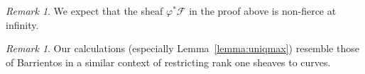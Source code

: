 \documentclass[twoside]{amsart}
\newcommand{\Ff}{\mathscr{F}}
\renewcommand{\phi}{\varphi}
\theoremstyle{plain}
\theoremstyle{definition}
\theoremstyle{remark}
\newtheorem{remark}[subsubsection]{Remark}
\numberwithin{equation}{subsection}
\begin{document}
\begin{remark}
We expect that the sheaf $\phi^* \Ff$ in the proof above is non-fierce at infinity.
\end{remark}

\begin{remark}
Our calculations (especially Lemma~\ref{lemma:uniqmax}) resemble those of Barrientos \cite[\S 5]{Barrientos} in a similar context of restricting rank one sheaves to curves.
\end{remark}

 

\end{document}
